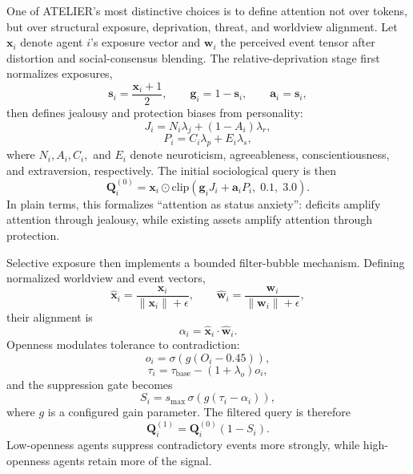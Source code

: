\documentclass[12pt]{IEEEtran}
\begin{document}
One of ATELIER's most distinctive choices is to define attention not over tokens, but over structural exposure, deprivation, threat, and worldview alignment. Let $\mathbf{x}_i$ denote agent $i$'s exposure vector and $\mathbf{w}_i$ the perceived event tensor after distortion and social-consensus blending. The relative-deprivation stage first normalizes exposures,
\begin{equation}
\mathbf{s}_i = \frac{\mathbf{x}_i + 1}{2}, \qquad \mathbf{g}_i = 1 - \mathbf{s}_i, \qquad \mathbf{a}_i = \mathbf{s}_i,
\end{equation}
then defines jealousy and protection biases from personality:
\begin{equation}
J_i = N_i \lambda_j + (1-A_i)\lambda_r,
\end{equation}
\begin{equation}
P_i = C_i \lambda_p + E_i \lambda_s,
\end{equation}
where $N_i, A_i, C_i,$ and $E_i$ denote neuroticism, agreeableness, conscientiousness, and extraversion, respectively. The initial sociological query is then
\begin{equation}
\mathbf{Q}_i^{(0)} = \mathbf{x}_i \odot \text{clip}(\mathbf{g}_i J_i + \mathbf{a}_i P_i,\; 0.1,\; 3.0).
\end{equation}
In plain terms, this formalizes ``attention as status anxiety'': deficits amplify attention through jealousy, while existing assets amplify attention through protection.

Selective exposure then implements a bounded filter-bubble mechanism. Defining normalized worldview and event vectors,
\begin{equation}
\hat{\mathbf{x}}_i = \frac{\mathbf{x}_i}{\|\mathbf{x}_i\|+\epsilon}, \qquad
\hat{\mathbf{w}}_i = \frac{\mathbf{w}_i}{\|\mathbf{w}_i\|+\epsilon},
\end{equation}
their alignment is
\begin{equation}
\alpha_i = \hat{\mathbf{x}}_i \cdot \hat{\mathbf{w}}_i.
\end{equation}
Openness modulates tolerance to contradiction:
\begin{equation}
o_i = \sigma\!\left(g(O_i - 0.45)\right),
\end{equation}
\begin{equation}
\tau_i = \tau_{\text{base}} - (1+\lambda_o)o_i,
\end{equation}
and the suppression gate becomes
\begin{equation}
S_i = s_{\max}\,\sigma\!\left(g(\tau_i-\alpha_i)\right),
\end{equation}
where $g$ is a configured gain parameter. The filtered query is therefore
\begin{equation}
\mathbf{Q}_i^{(1)} = \mathbf{Q}_i^{(0)}(1-S_i).
\end{equation}
Low-openness agents suppress contradictory events more strongly, while high-openness agents retain more of the signal.
\end{document}

